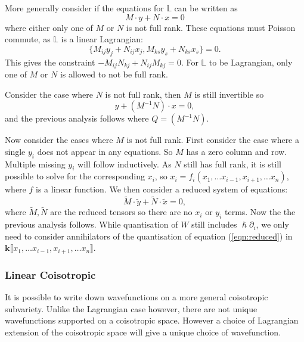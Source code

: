     More generally consider if the equations for \( \mathbb{L}\) can be written as
    \[ M \cdot y + N \cdot x = 0\]
    where either only one of \(M\) or \(N\) is not full rank. These equations must Poisson commute, as \(\mathbb{L}\) is a linear Lagrangian:
    \[ \{ M_{ij} y_j + N_{ij}x_j , M_{ks}y_s + N_{ks}x_s \} = 0.\]
    This gives the constraint \(- M_{ij} N_{kj}+N_{ij} M_{kj} = 0\). For \( \mathbb{L}\) to be Lagrangian, only one of \(M\) or \(N\) is allowed to not be full rank. 
    
    Consider the case where \(N\) is not full rank, then \(M\) is still invertible so
    \[ y + (M^{-1} N) \cdot x = 0,\]
    and the previous analysis follows where \( Q = (M^{-1} N)\). 
    
    Now consider the cases where \(M\) is not full rank. First consider the case where a single \(y_i\) does not appear in any equations. So \(M\) has a zero column and row. Multiple missing \(y_i\) will follow inductively. As \(N\) still has full rank, it is still possible to solve for the corresponding \(x_i\), so \(x_i = f_i(x_1, \dots x_{i-1}, x_{i+1}, \dots x_n)\), where \(f\) is a linear function. We then consider a reduced system of equations:
    \begin{equation} \label{eqn:reduced} \widetilde{M}\cdot \widetilde{y} + \widetilde{N} \cdot \widetilde{x} = 0,\end{equation}
    where \(\widetilde{M}, \widetilde{N} \) are the reduced tensors so there are no \(x_i\) or \(y_i\) terms. Now the the previous analysis follows.  While quantisation of \(W\) still includes \( \hslash \partial_i \), we only need to consider annihilators of the quantisation of equation (\ref{eqn:reduced}) in \( \mathbf{k} \lBrack x_1, \dots x_{i-1}, x_{i+1}, \dots x_n\rBrack\).
    
    
    \subsubsection{Linear Coisotropic}
    It is possible to write down wavefunctions on a more general coisotropic subvariety. Unlike the Lagrangian case however, there are not unique wavefunctions supported on a coisotropic space. However a choice of Lagrangian extension of the coisotropic space will give a unique choice of wavefunction.
    
